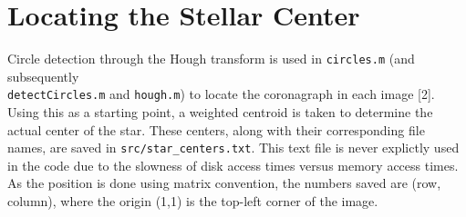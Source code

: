 \documentclass[12pt]{article}
\begin{document}
\section{Locating the Stellar Center}
Circle detection through the Hough transform is used in \texttt{circles.m} (and subsequently \\\texttt{detectCircles.m} and \texttt{hough.m}) to locate the coronagraph in each image [2]. Using this as a starting point, a weighted centroid is taken to determine the actual center of the star. These centers, along with their corresponding file names, are saved in \texttt{src/star\_centers.txt}. This text file is never explictly used in the code due to the slowness of disk access times versus memory access times. As the position is done using matrix convention, the numbers saved are (row, column), where the origin (1,1) is the top-left corner of the image.
\end{document}
